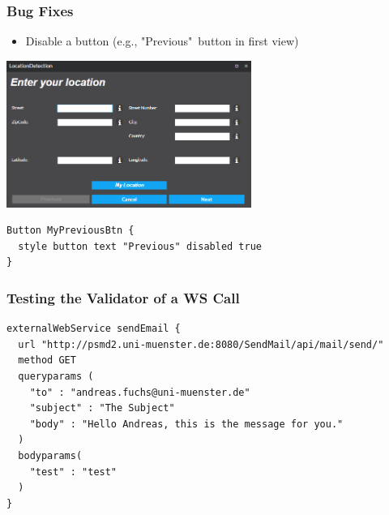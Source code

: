 
\begin{frame}[fragile]
    \frametitle{Bug Fixes}

\begin{itemize}
  \item Disable a button \tiny{(e.g., "Previous"\ button in first view)}  
\end{itemize}

\begin{center}
\includegraphics[width=0.6\textwidth] {images/disabled-previous-button.png}
\end{center}

\vspace{-1ex}

\begin{lstlisting}[basicstyle=\footnotesize\ttfamily]
Button MyPreviousBtn { 
  style button text "Previous" disabled true
}
\end{lstlisting}

\end{frame}	


\begin{frame}[fragile]
\frametitle{Testing the Validator of a WS Call}

\begin{lstlisting}
externalWebService sendEmail { 
  url "http://psmd2.uni-muenster.de:8080/SendMail/api/mail/send/" 
  method GET 
  queryparams ( 
    "to" : "andreas.fuchs@uni-muenster.de" 
    "subject" : "The Subject" 
    "body" : "Hello Andreas, this is the message for you."
  )
  bodyparams(
    "test" : "test"
  )
}
\end{lstlisting}
\end{frame}

